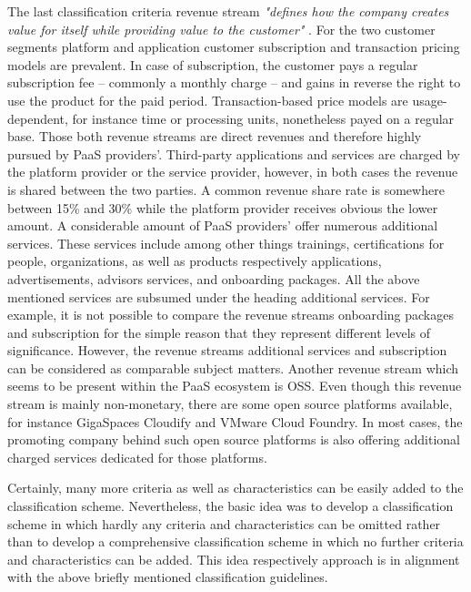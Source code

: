 The last classification criteria revenue stream \textit{"defines how the company creates value for itself while providing value to the customer"} \citep[p. 53]{Johnson2008}. For the two customer segments platform and application customer subscription and transaction pricing models are prevalent. In case of subscription, the customer pays a regular subscription fee -- commonly a monthly charge -- and gains in reverse the right to use the product for the paid period. Transaction-based price models are usage-dependent, for instance time or processing units, nonetheless payed on a regular base. Those both revenue streams are direct revenues and therefore highly pursued by \ac{PaaS} providers'. Third-party applications and services are charged by the platform provider or the service provider, however, in both cases the revenue is shared between the two parties. A common revenue share rate is somewhere between 15\% and 30\% while the platform provider receives obvious the lower amount. A considerable amount of \ac{PaaS} providers' offer numerous additional services. These services include among other things trainings, certifications for people, organizations, as well as products respectively applications, advertisements, advisors services, and onboarding packages. All the above mentioned services are subsumed under the heading additional services. For example, it is not possible to compare the revenue streams onboarding packages and subscription for the simple reason that they represent different levels of significance. However, the revenue streams additional services and subscription can be considered as comparable subject matters. Another revenue stream which seems to be present within the \ac{PaaS} ecosystem is \ac{OSS}. Even though this revenue stream is mainly non-monetary, there are some open source platforms available, for instance GigaSpaces Cloudify and VMware Cloud Foundry. In most cases, the promoting company behind such open source platforms is also offering additional charged services dedicated for those platforms.

Certainly, many more criteria as well as characteristics can be easily added to the classification scheme. Nevertheless, the basic idea was to develop a classification scheme in which hardly any criteria and characteristics can be omitted rather than to develop a comprehensive classification scheme in which no further criteria and characteristics can be added. This idea respectively approach is in alignment with the above briefly mentioned classification guidelines.

